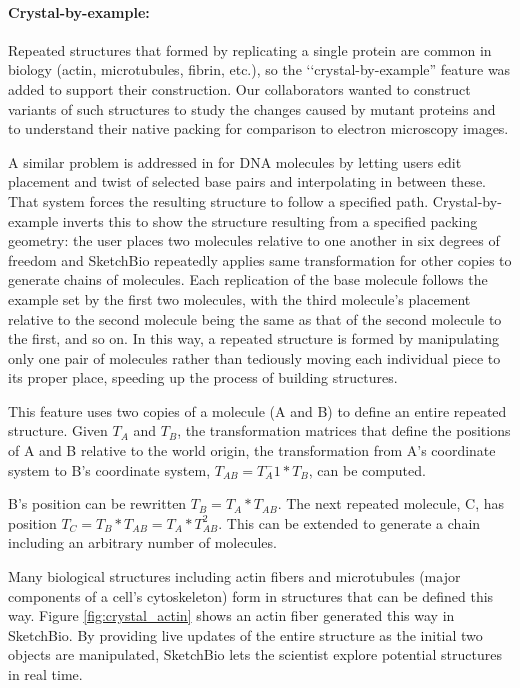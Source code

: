 \documentclass[twocolumn]{bmcart}%
\begin{document}
\paragraph*{Crystal-by-example:}
Repeated structures that formed by replicating a single protein are common in biology (actin, microtubules, fibrin, etc.), so the `‘crystal-by-example'' feature was added to support their construction.
Our collaborators wanted to construct variants of such structures to study the changes caused by mutant proteins and to understand their native packing for comparison to electron microscopy images.

A similar problem is addressed in \cite{hornus2013easy} for DNA molecules by letting users edit placement and twist of selected base pairs and interpolating in between these.  That system forces the resulting structure to follow a specified path.
Crystal-by-example inverts this to show the structure resulting from a specified packing geometry: the user places two molecules relative to one another in six degrees of freedom and SketchBio repeatedly applies same transformation for other copies to generate chains of molecules.
Each replication of the base molecule follows the example set by the first two molecules, with the third molecule's placement relative to the second molecule being the same as that of the second molecule to the first, and so on.
In this way, a repeated structure is formed by manipulating only one pair of molecules rather than tediously moving each individual piece to its proper place, speeding up the process of building structures.

This feature uses two copies of a molecule (A and B) to define an entire repeated structure.
Given $T_A$ and $T_B$, the transformation matrices that define the positions of A and B relative to the world origin, the transformation from A's coordinate system to B's coordinate system, $T_{AB} = T_A^-1*T_B$, can be computed.

B's position can be rewritten $T_B = T_A*T_{AB}$.  The next repeated molecule, C, has position $T_C = T_B*T_{AB} = T_A*T_{AB}^2$.
This can be extended to generate a chain including an arbitrary number of molecules.

Many biological structures including actin fibers and microtubules (major components of a cell's cytoskeleton) form in structures that can be defined this way.
Figure \ref{fig:crystal_actin} shows an actin fiber generated this way in SketchBio.
By providing live updates of the entire structure as the initial two objects are manipulated, SketchBio lets the scientist explore potential structures in real time.
\end{document}
